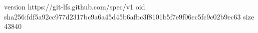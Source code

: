 version https://git-lfs.github.com/spec/v1
oid sha256:fdf5a92cc977d2317bc9a6a45d45b6afbc3f8101b5f7e9f06ec5fc9c02b9ec63
size 43840
